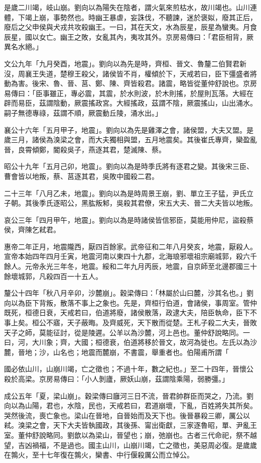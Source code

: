 \begin{pinyinscope}
是歲二川竭，岐山崩。劉向以為陽失在陰者，謂火氣來煎枯水，故川竭也。山川連體，下竭上崩，事勢然也。時幽王暴虐，妄誅伐，不聽諫，迷於褒姒，廢其正后，廢后之父申侯與犬戎共攻殺幽王。一曰，其在天文，水為辰星，辰星為蠻夷。月食辰星，國以女亡。幽王之敗，女亂其內，夷攻其外。京房易傳曰：「君臣相背，厥異名水絕。」

文公九年「九月癸酉，地震」。劉向以為先是時，齊桓、晉文、魯釐二伯賢君新沒，周襄王失道，楚穆王殺父，諸侯皆不肖，權傾於下，天戒若曰，臣下彊盛者將動為害。後宋、魯、晉、莒、鄭、陳、齊皆殺君。諸震，略皆從董仲舒說也。京房易傳曰：「臣事雖正，專必震，其震，於水則波，於木則搖，於屋則瓦落。大經在辟而易臣，茲謂陰動，厥震搖政宮。大經搖政，茲謂不陰，厥震搖山，山出涌水。嗣子無德專祿，茲謂不順，厥震動丘陵，涌水出。」

襄公十六年「五月甲子，地震」。劉向以為先是雞澤之會，諸侯盟，大夫又盟。是歲三月，諸侯為溴梁之會，而大夫獨相與盟，五月地震矣。其後崔氏專齊，欒盈亂晉，良霄傾鄭，閽殺吳子，燕逐其君，楚滅陳、蔡。

昭公十九年「五月己卯，地震」。劉向以為是時季氏將有逐君之變。其後宋三臣、曹會皆以地叛，蔡、莒逐其君，吳敗中國殺二君。

二十三年「八月乙未，地震」。劉向以為是時周景王崩，劉、單立王子猛，尹氏立子朝。其後季氏逐昭公，黑肱叛邾，吳殺其君僚，宋五大夫、晉二大夫皆以地叛。

哀公三年「四月甲午，地震」。劉向以為是時諸侯皆信邪臣，莫能用仲尼，盜殺蔡侯，齊陳乞弒君。

惠帝二年正月，地震隴西，厭四百餘家。武帝征和二年八月癸亥，地震，厭殺人。宣帝本始四年四月壬寅，地震河南以東四十九郡，北海琅邪壞祖宗廟城郭，殺六千餘人。元帝永光三年冬，地震。綏和二年九月丙辰，地震，自京師至北邊郡國三十餘壞城郭，凡殺四百一十五人。

釐公十四年「秋八月辛卯，沙麓崩」。穀梁傳曰：「林屬於山曰麓，沙其名也。」劉向以為臣下背叛，散落不事上之象也。先是，齊桓行伯道，會諸侯，事周室。管仲既死，桓德日衰，天戒若曰，伯道將廢，諸侯散落，政逮大夫，陪臣執命，臣下不事上矣。桓公不寤，天子蔽晦。及齊威死，天下散而從楚。王札子殺二大夫，晉敗天子之師，莫能征討，從是陵遲。公羊以為沙麓，河上邑也。董仲舒說略同。一曰，河，大川象；齊，大國；桓德衰，伯道將移於晉文，故河為徙也。左氏以為沙麓，晉地；沙，山名也；地震而麓崩，不書震，舉重者也。伯陽甫所謂「

國必依山川，山崩川竭，亡之徵也；不過十年，數之紀也。」至二十四年，晉懷公殺於高梁。京房易傳曰：「小人剝廬，厥妖山崩，茲謂陰乘陽，弱勝彊。」

成公五年「夏，梁山崩」。穀梁傳曰廱河三日不流，晉君帥群臣而哭之，乃流。劉向以為山陽，君也，水陰，民也，天戒若曰，君道崩壞，下亂，百姓將失其所矣。哭然後流，喪亡象也。梁山在晉地，自晉始而及天下也。後晉暴殺三卿，厲公以弒。溴梁之會，天下大夫皆執國政，其後孫、甯出衛獻，三家逐魯昭，單、尹亂王室。董仲舒說略同。劉歆以為梁山，晉望也；崩，弛崩也。古者三代命祀，祭不越望，吉凶禍福，不是過也。國主山川，山崩川竭，亡之徵也，美惡周必復。是歲歲在鶉火，至十七年復在鶉火，欒書、中行偃殺厲公而立悼公。


\end{pinyinscope}
